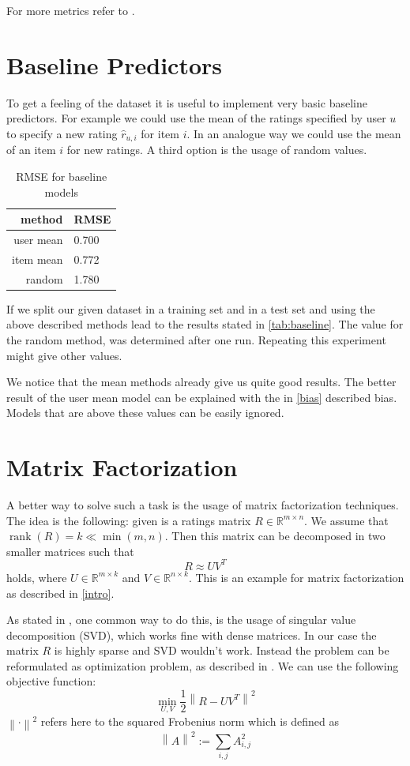 \documentclass[DIV=14,twocolumn]{scrartcl}
\DeclareMathOperator{\rank}{rank}
\newcommand{\norm}[1]{\left\lVert#1\right\rVert}
\begin{document}
For more metrics refer to \cite{Ag16}.

\section{Baseline Predictors}\label{baseline}
To get a feeling of the dataset it is useful to implement very basic baseline predictors. For example we could use the mean of the ratings specified by user $u$ to specify a new rating $\hat{r}_{u,i}$ for item $i$. In an analogue way we could use the mean of an item $i$ for new ratings. A third option is the usage of random values. 

\begin{table}[h]
	\centering
	\begin{tabular}{r|l}
		method & RMSE \\ \hline
		user mean & 0.700 \\
		item mean & 0.772 \\
		random & 1.780
	\end{tabular}
	\caption{RMSE for baseline models}
	\label{tab:baseline}
\end{table}

If we split our given dataset in a training set and in a test set and using the above described methods lead to the results stated in \autoref{tab:baseline}. The value for the random method, was determined after one run. Repeating this experiment might give other values.

We notice that the mean methods already give us quite good results. The better result of the user mean model can be explained with the in \autoref{bias} described bias. Models that are above these values can be easily ignored. 


\section{Matrix Factorization}\label{matrixfactorization}
A better way to solve such a task is the usage of matrix factorization techniques. The idea is the following: given is a ratings matrix $R\in\mathbb{R}^{m\times n}$. We assume that $\rank(R)=k\ll\min(m,n)$. Then this matrix can be decomposed in two smaller matrices such that 
$$R\approx UV^T$$ holds, where $U\in\mathbb{R}^{m\times k}$ and $V\in\mathbb{R}^{n\times k}$. This is an example for matrix factorization as described in \autoref{intro}.

As stated in \cite{KoBeVo09}, one common way to do this, is the usage of singular value decomposition (SVD), which works fine with dense matrices. In our case the matrix $R$ is highly sparse and SVD wouldn't work. Instead the problem can be reformulated as optimization problem, as described in \cite{Ag16}. We can use the following objective function: 
$$\min_{U,V} \frac{1}{2}\norm{R-UV^T}^2$$ 
$\norm{\cdot}^2$ refers here to the squared Frobenius norm which is defined as $$\norm{A}^2:=\sum_{i,j}A_{i,j}^2$$
\end{document}
